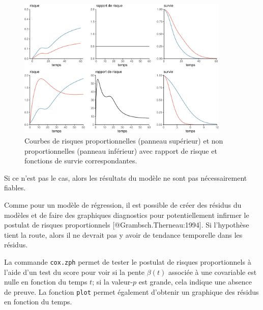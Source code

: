 \documentclass[
  11pt,
  letterpaper,
]{book}
\theoremstyle{definition}
\theoremstyle{remark}
\begin{document}
\begin{figure}[ht!]

{\centering \includegraphics[width=0.9\textwidth,height=\textheight]{./06-survie_files/figure-pdf/fig-risquepropfig-1.pdf}

}

\caption{\label{fig-risquepropfig}Courbes de risques proportionnelles
(panneau supérieur) et non proportionnelles (panneau inférieur) avec
rapport de risque et fonctions de survie correspondantes.}

\end{figure}

Si ce n'est pas le cas, alors les résultats du modèle ne sont pas
nécessairement fiables.

Comme pour un modèle de régression, il est possible de créer des résidus
du modèles et de faire des graphiques diagnostics pour potentiellement
infirmer le postulat de risques proportionnels
{[}@Grambsch.Therneau:1994{]}. Si l'hypothèse tient la route, alors il
ne devrait pas y avoir de tendance temporelle dans les résidus.

La commande \texttt{cox.zph} permet de tester le postulat de risques
proportionnels à l'aide d'un test du score pour voir si la pente
\(\beta(t)\) associée à une covariable est nulle en fonction du temps
\(t\); si la valeur-\(p\) est grande, cela indique une absence de
preuve. La fonction \texttt{plot} permet également d'obtenir un
graphique des résidus en fonction du temps.
\end{document}
